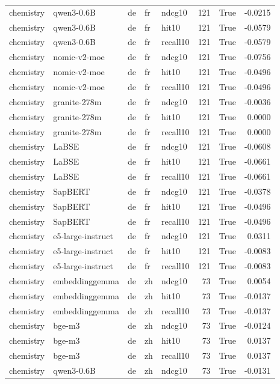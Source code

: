 \begin{tabular}{lllllrrr}
chemistry & qwen3-0.6B & de & fr & ndcg10 & 121 & True & -0.0215 \\
chemistry & qwen3-0.6B & de & fr & hit10 & 121 & True & -0.0579 \\
chemistry & qwen3-0.6B & de & fr & recall10 & 121 & True & -0.0579 \\
chemistry & nomic-v2-moe & de & fr & ndcg10 & 121 & True & -0.0756 \\
chemistry & nomic-v2-moe & de & fr & hit10 & 121 & True & -0.0496 \\
chemistry & nomic-v2-moe & de & fr & recall10 & 121 & True & -0.0496 \\
chemistry & granite-278m & de & fr & ndcg10 & 121 & True & -0.0036 \\
chemistry & granite-278m & de & fr & hit10 & 121 & True & 0.0000 \\
chemistry & granite-278m & de & fr & recall10 & 121 & True & 0.0000 \\
chemistry & LaBSE & de & fr & ndcg10 & 121 & True & -0.0608 \\
chemistry & LaBSE & de & fr & hit10 & 121 & True & -0.0661 \\
chemistry & LaBSE & de & fr & recall10 & 121 & True & -0.0661 \\
chemistry & SapBERT & de & fr & ndcg10 & 121 & True & -0.0378 \\
chemistry & SapBERT & de & fr & hit10 & 121 & True & -0.0496 \\
chemistry & SapBERT & de & fr & recall10 & 121 & True & -0.0496 \\
chemistry & e5-large-instruct & de & fr & ndcg10 & 121 & True & 0.0311 \\
chemistry & e5-large-instruct & de & fr & hit10 & 121 & True & -0.0083 \\
chemistry & e5-large-instruct & de & fr & recall10 & 121 & True & -0.0083 \\
chemistry & embeddinggemma & de & zh & ndcg10 & 73 & True & 0.0054 \\
chemistry & embeddinggemma & de & zh & hit10 & 73 & True & -0.0137 \\
chemistry & embeddinggemma & de & zh & recall10 & 73 & True & -0.0137 \\
chemistry & bge-m3 & de & zh & ndcg10 & 73 & True & -0.0124 \\
chemistry & bge-m3 & de & zh & hit10 & 73 & True & 0.0137 \\
chemistry & bge-m3 & de & zh & recall10 & 73 & True & 0.0137 \\
chemistry & qwen3-0.6B & de & zh & ndcg10 & 73 & True & -0.0131 \\

\end{tabular}
